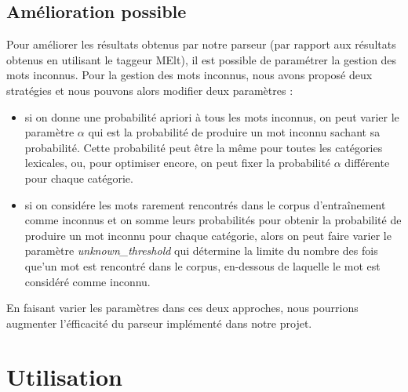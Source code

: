 \documentclass[12pt]{article}
\begin{document}
\subsection{Am\'elioration possible}
Pour am\'eliorer les r\'esultats obtenus par notre parseur (par rapport aux
r\'esultats obtenus en utilisant le taggeur MElt), il est possible de
param\'etrer la gestion des mots inconnus.
Pour la gestion des mots inconnus, nous avons propos\'e deux strat\'egies et
nous pouvons alors modifier deux param\`etres :
\begin{itemize}
  \item  si on donne une probabilit\'e apriori \`a tous les mots inconnus, on
  peut varier le param\`etre $\alpha$ qui est la probabilit\'e de produire un
  mot inconnu sachant sa probabilit\'e. Cette probabilit\'e peut \^etre la m\^eme
  pour toutes les cat\'egories lexicales, ou, pour optimiser encore, on peut
  fixer la probabilit\'e $\alpha$ diff\'erente pour chaque cat\'egorie.
  \item si on consid\'ere les mots rarement rencontr\'es dans le corpus
  d'entra\^inement comme inconnus et on somme leurs probabilit\'es pour obtenir la probabilit\'e de produire un mot inconnu pour
  chaque cat\'egorie, alors on peut faire varier le param\`etre
  \textit{unknown\_threshold} qui d\'etermine la limite du nombre des
  fois que'un mot est rencontr\'e dans le corpus, en-dessous de laquelle le mot
  est consid\'er\'e comme inconnu.
\end{itemize} 

En faisant varier les param\`etres dans ces deux approches, nous pourrions
augmenter l'\'efficacit\'e du parseur impl\'ement\'e dans notre projet.


\section{Utilisation}
\end{document}
